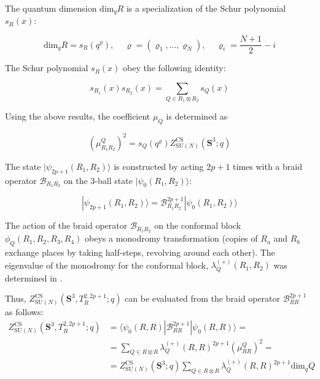 \documentclass[a4paper,titlepage,twoside]{book}
\begin{document}
The quantum dimension $\text{dim}_q{R}$ is a specialization of the Schur polynomial $s_R{(x)}$:

\begin{equation}
\text{dim}_q{R} = s_R{ (q^{ \varrho} ) }, \quad \, \varrho = (\varrho_1, \dots , \varrho_N), \quad \, \varrho_i = \frac{N+1}{2} -i  
\end{equation}

The Schur polynomial $s_R{(x)}$ obey the following identity:

\begin{equation}
  s_{R_1}{ (x)} s_{R_2}{ (x)} = \sum_{ Q \in R_1 \otimes R_2} s_Q{(x)}
\end{equation}

Using the above results, the coefficient $\mu_Q$ is determined as 

\begin{equation}
  \left( \mu^Q_{R_1R_2} \right)^2 = s_Q{ (q^{ \varrho} ) } Z^{\text{CS}}_{ \text{SU}{(N)}}{ (\mathbf{S}^3; q)}
\end{equation}

The state $|\psi_{2p+1}{ (R_1, R_2) } \rangle$ is constructed by acting $2p+1$ times with a braid operator $\mathcal{B}_{R_1 R_2}$ on the 3-ball state $|\psi_0{(R_1,R_2)} \rangle$:

\begin{equation}
  | \psi_{2p+1}{ (R_1 , R_2) } \rangle = \mathcal{B}^{2p+1}_{ R_1 R_2} | \psi_0{ (R_1,R_2)} \rangle
\end{equation}

The action of the braid operator $\mathcal{B}_{R_1R_2}$ on the conformal block $\phi_Q{ (R_1, R_2,R_3,R_4)}$ obeys a monodromy transformation (copies of $R_a$ and $R_b$ exchange places by taking half-steps, revolving around each other).  The eigenvalue of the monodromy for the conformal block, $\lambda^{(+)}_Q{ (R_1,R_2)}$ was determined in \cite{MooreSeiberg1989}.  

Thus, $Z^{\text{CS}}_{\text{SU}{(N)}  }{ (\mathbf{S}^3, T_R^{2,2p+1}; q) }$ can be evaluated from the braid operator $\mathcal{B}^{2p+1}_{RR}$ as follows:
\begin{equation}
  \begin{aligned}
    Z^{\text{CS}}_{ \text{SU}{(N)} }{ ( \mathbf{S}^3, T_R^{2,2p+1}; q) } & = \langle \psi_0{ (R,R)} | \mathcal{B}_{RR}^{2p+1} | \psi_0{ (R,R) } \rangle  = \\
&    = \sum_{Q\in R\otimes R} \lambda_Q^{ (+)}{ (R,R)}^{2p+1} \left( \mu^Q_{RR} \right)^2 = \\ 
&    = Z^{ \text{CS}}_{ \text{SU}{(N)}}{ (\mathbf{S}^3; q) } \sum_{Q \in R\otimes R} \lambda_Q^{(+)}{ (R,R)}^{2p+1} \text{dim}_qQ
  \end{aligned}
\end{equation}
\end{document}
